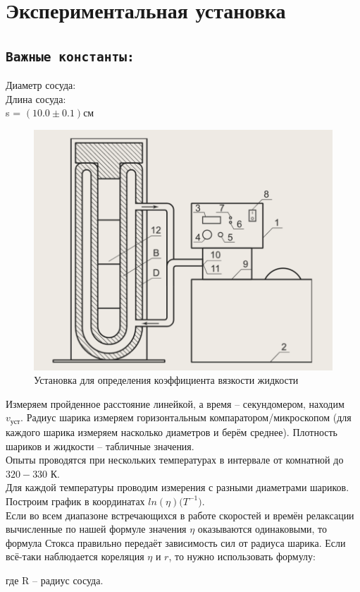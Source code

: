 \documentclass[11pt,a4paper]{article}
\begin{document}
\newpage

\section*{Экспериментальная установка}
\subsection*{\texttt{Важные константы:}}
  \indent Диаметр сосуда:\\
  \indent Длина сосуда:\\
  \indent s = $(10.0 \pm 0.1) \text{см}$

\begin{figure}[h!]
  \includegraphics*[width=\textwidth]{ust.png}
  \caption{Установка для определения коэффициента
  вязкости жидкости}
  \label{fig:ust}
\end{figure}

Измеряем пройденное расстояние линейкой, а время -- секундомером,
находим $v_\text{уст}$. Радиус шарика измеряем горизонтальным
компаратором/микроскопом (для каждого шарика измеряем насколько диаметров и берём среднее).
Плотность шариков и жидкости -- табличные значения.\\
Опыты проводятся при нескольких температурах в интервале от
комнатной до $320-330$ К.\\
Для каждой температуры проводим измерения с разными диаметрами шариков.\\
Построим график в координатах $ln(\eta) \bigl(T^{-1}\bigr)$.\\
Если во всем диапазоне встречающихся в работе 
скоростей и времён релаксации вычисленные по нашей формуле
значения $\eta$ оказываются одинаковыми, то формула Стокса правильно
передаёт зависимость сил от радиуса шарика.
Если всё-таки наблюдается кореляция $\eta$ и $r$, то нужно использовать формулу:
\begin{center}{
  }\end{center}
где R --  радиус сосуда.
  
\end{document}
